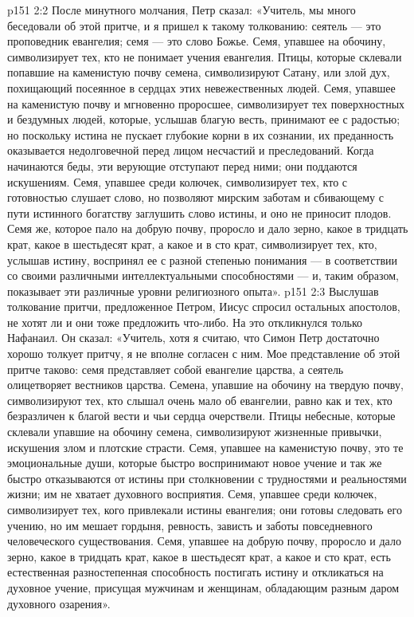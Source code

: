 \vs p151 2:2 После минутного молчания, Петр сказал: «Учитель, мы много беседовали об этой притче, и я пришел к такому толкованию: сеятель --- это проповедник евангелия; семя --- это слово Божье. Семя, упавшее на обочину, символизирует тех, кто не понимает учения евангелия. Птицы, которые склевали попавшие на каменистую почву семена, символизируют Сатану, или злой дух, похищающий посеянное в сердцах этих невежественных людей. Семя, упавшее на каменистую почву и мгновенно проросшее, символизирует тех поверхностных и бездумных людей, которые, услышав благую весть, принимают ее с радостью; но поскольку истина не пускает глубокие корни в их сознании, их преданность оказывается недолговечной перед лицом несчастий и преследований. Когда начинаются беды, эти верующие отступают перед ними; они поддаются искушениям. Семя, упавшее среди колючек, символизирует тех, кто с готовностью слушает слово, но позволяют мирским заботам и сбивающему с пути истинного богатству заглушить слово истины, и оно не приносит плодов. Семя же, которое пало на добрую почву, проросло и дало зерно, какое в тридцать крат, какое в шестьдесят крат, а какое и в сто крат, символизирует тех, кто, услышав истину, воспринял ее с разной степенью понимания --- в соответствии со своими различными интеллектуальными способностями --- и, таким образом, показывает эти различные уровни религиозного опыта».
\vs p151 2:3 Выслушав толкование притчи, предложенное Петром, Иисус спросил остальных апостолов, не хотят ли и они тоже предложить что\hyp{}либо. На это откликнулся только Нафанаил. Он сказал: «Учитель, хотя я считаю, что Симон Петр достаточно хорошо толкует притчу, я не вполне согласен с ним. Мое представление об этой притче таково: семя представляет собой евангелие царства, а сеятель олицетворяет вестников царства. Семена, упавшие на обочину на твердую почву, символизируют тех, кто слышал очень мало об евангелии, равно как и тех, кто безразличен к благой вести и чьи сердца очерствели. Птицы небесные, которые склевали упавшие на обочину семена, символизируют жизненные привычки, искушения злом и плотские страсти. Семя, упавшее на каменистую почву, это те эмоциональные души, которые быстро воспринимают новое учение и так же быстро отказываются от истины при столкновении с трудностями и реальностями жизни; им не хватает духовного восприятия. Семя, упавшее среди колючек, символизирует тех, кого привлекали истины евангелия; они готовы следовать его учению, но им мешает гордыня, ревность, зависть и заботы повседневного человеческого существования. Семя, упавшее на добрую почву, проросло и дало зерно, какое в тридцать крат, какое в шестьдесят крат, а какое и сто крат, есть естественная разностепенная способность постигать истину и откликаться на духовное учение, присущая мужчинам и женщинам, обладающим разным даром духовного озарения».
